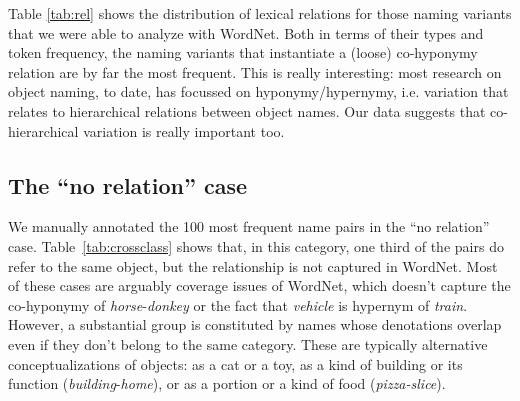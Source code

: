  

Table \ref{tab:rel} shows the distribution of lexical relations for those naming variants that we were able to analyze with WordNet.
Both in terms of their types and token frequency, the naming variants that instantiate a (loose) co-hyponymy relation are by far the most frequent.
This is really interesting: most research on object naming, to date, has focussed on hyponymy/hypernymy, i.e. variation that relates to hierarchical relations between object names.
Our data suggests that co-hierarchical variation is really important too.

\subsection{The ``no relation'' case}

We manually annotated the 100 most frequent name pairs in the ``no relation'' case. Table~\ref{tab:crossclass} shows that, in this category, one third of the pairs do refer to the same object, but the relationship is not captured in WordNet. 
Most of these cases are arguably coverage issues of WordNet, which doesn't capture the co-hyponymy of \textit{horse}-\textit{donkey} or the fact that \textit{vehicle} is hypernym of \textit{train}.
However, a substantial group is constituted by names whose denotations overlap even if they don't belong to the same category. These are typically alternative conceptualizations of objects: as a cat or a toy, as a kind of building or its function (\textit{building}-\textit{home}), or as a portion or a kind of food (\textit{pizza-slice}).


